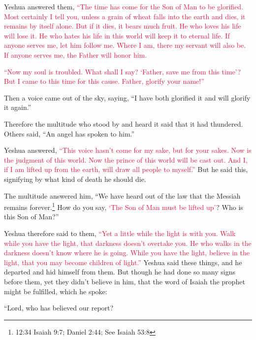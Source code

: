 \myverse{}Yeshua answered them,
\textcolor{crimson}{“The time has come for the Son of Man to be glorified.
}
\myverse{}\textcolor{crimson}{Most certainly I tell you, unless a grain of wheat falls into the earth
	and dies, it remains by itself alone. But if it dies, it bears much fruit.
}
\myverse{}\textcolor{crimson}{He who loves his life will lose it. He who hates his life in this world
	will keep it to eternal life.
}
\myverse{}\textcolor{crimson}{If anyone serves me, let him follow me. Where I am, there my servant
	will also be. If anyone serves me, the Father will honor him.}

\myverse{}\textcolor{crimson}{“Now my soul is troubled. What shall I say? ‘Father, save
	me from this time’? But I came to this time for this cause.
}
\myverse{}\textcolor{crimson}{Father, glorify your name!”}

Then a voice came out of the sky, saying, “I have both glorified it and will glorify it again.”

\myverse{}Therefore the multitude who stood by and heard it said that
it had thundered. Others said, “An angel has spoken to him.”

\myverse{}Yeshua answered,
\textcolor{crimson}{“This voice hasn’t come for my sake, but for your sakes.
}
\myverse{}\textcolor{crimson}{Now is the judgment of this world. Now the prince of this world will
	be cast out.
}
\myverse{}\textcolor{crimson}{And I, if I am lifted up from the earth, will draw all people to myself.”}
\myverse{}But he said this, signifying by what kind of death he should die.

\myverse{}The multitude answered him, “We have heard out of the law that
the Messiah remains forever.\footnote{12:34 Isaiah 9:7;
	Daniel 2:44; See
	Isaiah 53:8} How do you say,
\textcolor{crimson}{‘The Son of Man must be lifted up’}? Who is this Son of Man?”

\myverse{}Yeshua therefore said to them,
\textcolor{crimson}{“Yet a little while the light is with you. Walk while you have the light, that darkness doesn’t overtake
	you. He who walks in the darkness doesn’t know where he is going.
}
\myverse{}\textcolor{crimson}{While you have the light, believe in the light, that you may become children
	of light.”} Yeshua said these things, and he departed and hid himself from them.
\myverse{}But though he had done so many signs before them, yet they didn’t believe
in him,
\myverse{}that the word of Isaiah the prophet might be fulfilled, which he spoke:

“Lord, who has believed our report?

